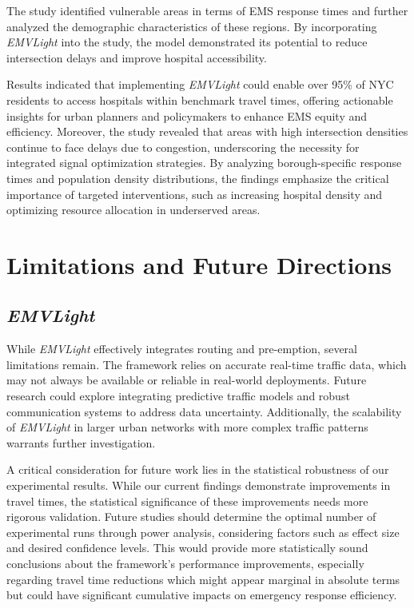 The study identified vulnerable areas in terms of EMS response times and further analyzed the demographic characteristics of these regions. By incorporating \textit{EMVLight} into the study, the model demonstrated its potential to reduce intersection delays and improve hospital accessibility.

Results indicated that implementing \textit{EMVLight} could enable over 95\% of NYC residents to access hospitals within benchmark travel times, offering actionable insights for urban planners and policymakers to enhance EMS equity and efficiency. Moreover, the study revealed that areas with high intersection densities continue to face delays due to congestion, underscoring the necessity for integrated signal optimization strategies. By analyzing borough-specific response times and population density distributions, the findings emphasize the critical importance of targeted interventions, such as increasing hospital density and optimizing resource allocation in underserved areas.
\section{Limitations and Future Directions}\label{sec:limitations}

\subsection{\textit{EMVLight}}
While \textit{EMVLight} effectively integrates routing and pre-emption, several limitations remain. The framework relies on accurate real-time traffic data, which may not always be available or reliable in real-world deployments. Future research could explore integrating predictive traffic models and robust communication systems to address data uncertainty. Additionally, the scalability of \textit{EMVLight} in larger urban networks with more complex traffic patterns warrants further investigation. 

A critical consideration for future work lies in the statistical robustness of our experimental results. While our current findings demonstrate improvements in travel times, the statistical significance of these improvements needs more rigorous validation. Future studies should determine the optimal number of experimental runs through power analysis, considering factors such as effect size and desired confidence levels. This would provide more statistically sound conclusions about the framework's performance improvements, especially regarding travel time reductions which might appear marginal in absolute terms but could have significant cumulative impacts on emergency response efficiency.

